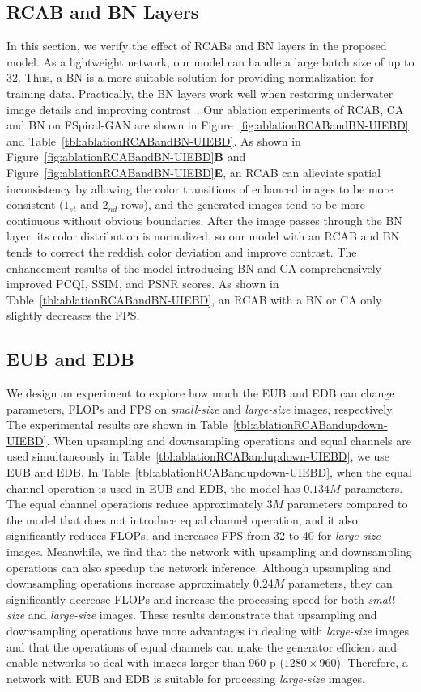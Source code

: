 \documentclass[utf8]{FrontiersinHarvard} %
\begin{document}
\subsection{RCAB and BN Layers}
In this section, we verify the effect of RCABs and BN layers in the proposed model. As a lightweight network, our model can handle a large batch size of up to 32. Thus, a BN is a more suitable solution for providing normalization for training data. Practically, the BN layers work well when restoring underwater image details and improving contrast~\citep{2019Underwater}. Our ablation experiments of RCAB, CA and BN on FSpiral-GAN are shown in Figure~\ref{fig:ablationRCABandBN-UIEBD} and Table~\ref{tbl:ablationRCABandBN-UIEBD}. As shown in Figure~\ref{fig:ablationRCABandBN-UIEBD}\textbf{B} and Figure~\ref{fig:ablationRCABandBN-UIEBD}\textbf{E}, an RCAB can alleviate spatial inconsistency by allowing the color transitions of enhanced images to be more consistent ($1_{st}$ and $2_{nd}$ rows), and the generated images tend to be more continuous without obvious boundaries. After the image passes through the BN layer, its color distribution is normalized, so our model with an RCAB and BN tends to correct the reddish color deviation and improve contrast. {The enhancement results of the model introducing BN and CA comprehensively improved PCQI, SSIM, and PSNR scores. As shown in Table~\ref{tbl:ablationRCABandBN-UIEBD}, an RCAB with a BN or CA only slightly decreases the FPS}.

\subsection{EUB and EDB}
We design an experiment to explore how much the EUB and EDB can change parameters, FLOPs and FPS on \textit{small-size} and \textit{large-size} images, respectively. The experimental results are shown in Table~\ref{tbl:ablationRCABandupdown-UIEBD}. When upsampling and downsampling operations and equal channels are used simultaneously in Table~\ref{tbl:ablationRCABandupdown-UIEBD}, we use EUB and EDB. In Table~\ref{tbl:ablationRCABandupdown-UIEBD}, {when the equal channel operation is used in EUB and EDB, the model has $0.134M$ parameters. The equal channel operations reduce approximately $3M$ parameters compared to the model that does not introduce equal channel operation, and it also significantly reduces FLOPs, and increases FPS from 32 to 40 for \textit{large-size} images. Meanwhile, we find that the network with upsampling and downsampling operations can also speedup the network inference. Although upsampling and downsampling operations increase approximately $0.24M$ parameters, they can significantly decrease FLOPs and increase the processing speed for both \textit{small-size} and \textit{large-size} images}. These results demonstrate that upsampling and downsampling operations have more advantages in dealing with \textit{large-size} images and that the operations of equal channels can make the generator efficient and enable networks to deal with images larger than 960 p ($1280\times960$). Therefore, a network with EUB and EDB is suitable for processing \textit{large-size} images.
\end{document}
